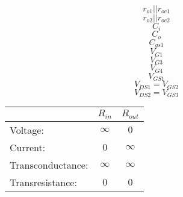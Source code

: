 \documentclass[letterpaper 12pt]{book}
\begin{document}
\[ r_{o1}||r_{oc1} \]
\[ r_{o2} || r_{oc2} \]
\[ C_i \]
\[ C_o \]
\[ C_{gs1} \]
\[ V_{G1} \]
\[ V_{G3} \]
\[ V_{G4} \]
\[ V_{GS1} \]
\[ V_{DS1} = V_{GS2} \]
\[ V_{DS2} = V_{GS3} \]


\begin{tabular}{| l | c| c |}
\hline
  &  $R_{in}$ &  $R_{out}$ \\
  \hline
 Voltage: & $\infty$ &  $0$ \\
 Current: & $0$  &  $\infty$ \\
 Transconductance: & $\infty$ &  $\infty$ \\
 Transresistance: & $0$ &  $0$ \\

\hline
\end{tabular} 
\end{document}
